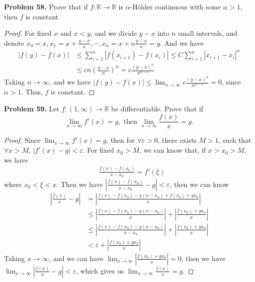 \documentclass[12pt,leqno]{amsart}
\begin{document}
\noindent
{\bf Problem 58.}
Prove that if $f:\mathbb{R}\to\mathbb{R}$ is $\alpha$-H\"{o}lder continuous with some $\alpha>1$, then $f$ is constant.
\begin{proof}
For fixed $x$ and $x<y$, and we divide $y-x$ into $n$ small intervals, and denote $x_0=x, x_1=x+\frac{y-x}{n},\cdots, x_{n}=x+n\frac{y-x}{n}=y$. And we have 
\begin{align*}
    |f(y)-f(x)| &\leq \sum^{n}_{i=1}|f(x_{i+1})-f(x_i)|\leq C \sum^{n}_{i=1} |x_{i+1}-x_i|^\alpha \\
    & \leq c n \left(\frac{y-x}{n}\right)^\alpha = c \frac{(y-x)^\alpha}{n^{\alpha-1}}
\end{align*}
Taking $n\to\infty$, and we have $|f(y)-f(x)|\leq \lim_{n\to\infty}c \frac{(y-x)^\alpha}{n^{\alpha-1}} =0$, since $\alpha>1$. Thus, $f$ is constant.
\end{proof}

\medskip

\noindent
{\bf Problem 59.}
Let $f:(1,\infty)\to\mathbb{R}$ be differentiable. Prove that if
$$
\lim_{x\to\infty} f'(x) = g,\text{ then }\lim_{x\to\infty }\frac{f(x)}{x} = g.
$$
\begin{proof}
Since $\lim_{x\to\infty} f'(x) = g$, then for $\forall \varepsilon >0$, there exists $M>1$, such that $\forall x>M$, $|f'(x)-g |<\varepsilon$. For fixed $x_0>M$, we can know that, if $x>x_0>M$, we have 
\begin{align*}
    &\frac{f(x)-f(x_0)}{x-x_0} = f'(\xi) 
\end{align*}
where $x_0<\xi<x$. Then we have $\left|\frac{f(x)-f(x_0)}{x-x_0} - g\right|<\varepsilon$, then we can know 
\begin{align*}
    \left|\frac{f(x)}{x}-g\right| & = \left|\frac{f(x)-f(x_0)-g(x-x_0)+f(x_0)+gx_0}{x}\right|\\
    & \leq \left|\frac{f(x)-f(x_0)-g(x-x_0)}{x}\right| + \left|\frac{f(x_0)+gx_0}{x}\right| \\
    & \leq \left|\frac{f(x)-f(x_0)-g(x-x_0)}{x-x_0}\right| + \left|\frac{f(x_0)+gx_0}{x}\right| \\
    & <  \varepsilon + \left|\frac{f(x_0)+gx_0}{x}\right|
\end{align*}
Taking $x\to\infty$, and we can have $\lim_{x\to\infty}\left|\frac{f(x_0)+gx_0}{x}\right| = 0$, then we have $\lim_{x\to\infty}\left|\frac{f(x)}{x}-g\right|<\varepsilon$, which gives us $\lim_{x\to\infty }\frac{f(x)}{x} = g$.
\end{proof}

\medskip
\end{document}
